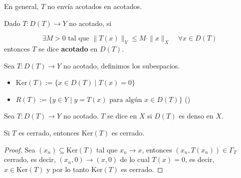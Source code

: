 \begin{observacion}
    En general, $T$ no envía acotados en acotados.
\end{observacion}

\begin{definicion}
    Dado $T: D(T) \to Y$ no acotado, si 
    
    \begin{equation*}
        \exists M > 0 \text{ tal que } \|T(x)\|_Y \leq M \cdot \|x\|_X \quad \forall x \in D(T)
    \end{equation*}
    entonces $T$ se dice \textbf{acotado} en $D(T)$.
\end{definicion}

\begin{definicion}
    Sea $T: D(T) \to Y$ no acotado, definimos los subespacios.
    \begin{itemize}
        \item $\text{Ker}(T):= \{ x \in D(T) \mid T(x) = 0 \}$
        \item $R(T) := \{ y \in Y \mid y = T(x) \text{ para algún } x \in D(T) \}$ ()
    \end{itemize}
\end{definicion}

\begin{definicion}
    Sea $T: D(T) \to Y$ no acotado. $T$ se dice  en $X$ si $D(T)$ es denso en $X$. \\
\end{definicion}

\begin{prop}
    Si $T$ es cerrado, entonces $\text{Ker}(T)$ es cerrado.
\begin{proof}
    Sea $(x_n) \subseteq \text{Ker}(T)$ tal que $x_n \to x$, entonces $(x_n, T(x_n)) \in \Gamma_T$ cerrado, es decir, $(x_n, 0) \to (x, 0)$ de lo cual $T(x) = 0$, es decir, $x \in \text{Ker}(T)$ y por lo tanto $\text{Ker}(T)$ es cerrado.
\end{proof}
\end{prop}

